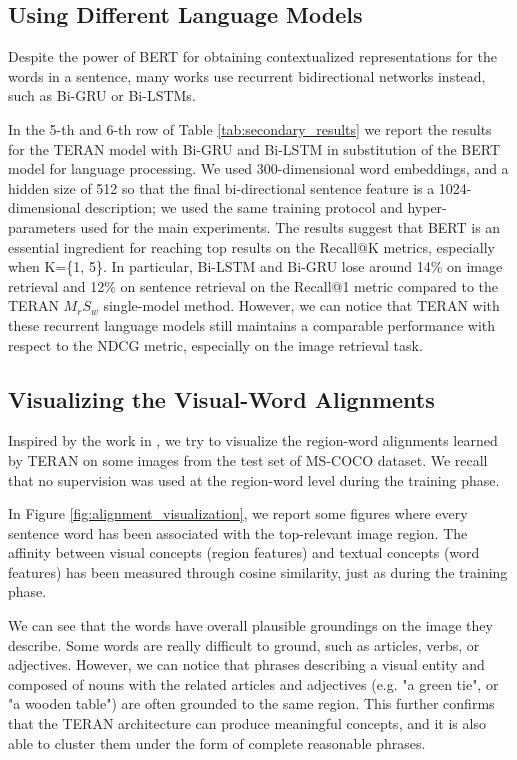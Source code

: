 \documentclass[acmsmall]{acmart}
\newcommand{\majorrevised}[1]{#1}
\begin{document}
\majorrevised{
\subsection{Using Different Language Models}
Despite the power of BERT \cite{devlin2019bert} for obtaining contextualized representations for the words in a sentence, many works use recurrent bidirectional networks instead, such as Bi-GRU or Bi-LSTMs. 

In the 5-th and 6-th row of Table \ref{tab:secondary_results} we report the results for the TERAN model with Bi-GRU and Bi-LSTM in substitution of the BERT model for language processing. We used 300-dimensional word embeddings, and a hidden size of 512 so that the final bi-directional sentence feature is a 1024-dimensional description; we used the same training protocol and hyper-parameters used for the main experiments. The results suggest that BERT is an essential ingredient for reaching top results on the Recall@K metrics, especially when K=\{1, 5\}. In particular, Bi-LSTM and Bi-GRU lose around 14\% on image retrieval and 12\% on sentence retrieval on the Recall@1 metric compared to the TERAN $M_{r}S_{w}$ single-model method. However, we can notice that TERAN with these recurrent language models still maintains a comparable performance with respect to the NDCG metric, especially on the image retrieval task.
}

\subsection{Visualizing the Visual-Word Alignments}
\label{sec:visualize_alignments}
Inspired by the work in \cite{karpathy2015alignment}, we try to visualize the region-word alignments learned by TERAN on some images from the test set of MS-COCO dataset. We recall that no supervision was used at the region-word level during the training phase.

In Figure \ref{fig:alignment_visualization}, we report some figures where every sentence word has been associated with the top-relevant image region. The affinity between visual concepts (region features) and textual concepts (word features) has been measured through cosine similarity, just as during the training phase. 

We can see that the words have overall plausible groundings on the image they describe. Some words are really difficult to ground, such as articles, verbs, or adjectives. However, we can notice that phrases describing a visual entity and composed of nouns with the related articles and adjectives (e.g. "a green tie", or "a wooden table") are often grounded to the same region.
This further confirms that the TERAN architecture can produce meaningful concepts, and it is also able to cluster them under the form of complete reasonable phrases.
\end{document}
